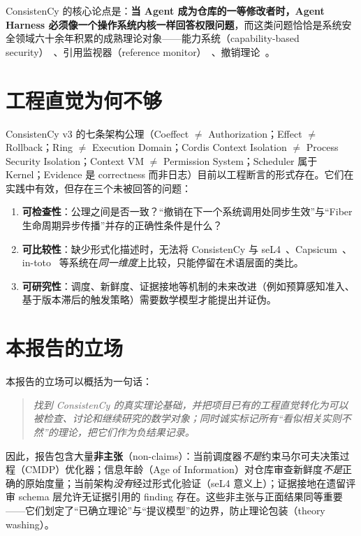 ConsistenCy 的核心论点是：\textbf{当 Agent 成为仓库的一等修改者时，Agent Harness 必须像一个操作系统内核一样回答权限问题}，而这类问题恰恰是系统安全领域六十余年积累的成熟理论对象——能力系统（capability-based security）~\cite{dennis1966,saltzer1975,miller2003,miller2006}、引用监视器（reference monitor）~\cite{anderson1972}、撤销理论~\cite{redell1974}。

\section{工程直觉为何不够}

ConsistenCy v3 的七条架构公理（Coeffect $\neq$ Authorization；Effect $\neq$ Rollback；Ring $\neq$ Execution Domain；Cordis Context Isolation $\neq$ Process Security Isolation；Context VM $\neq$ Permission System；Scheduler 属于 Kernel；Evidence 是 correctness 而非日志）目前以工程断言的形式存在。它们在实践中有效，但存在三个未被回答的问题：
\begin{enumerate}[itemsep=0.1em]
  \item \textbf{可检查性}：公理之间是否一致？“撤销在下一个系统调用处同步生效”与“Fiber 生命周期异步传播”并存的正确性条件是什么？
  \item \textbf{可比较性}：缺少形式化描述时，无法将 ConsistenCy 与 seL4~\cite{klein2009}、Capsicum~\cite{watson2010}、in-toto~\cite{torresarias2019} 等系统在\emph{同一维度}上比较，只能停留在术语层面的类比。
  \item \textbf{可研究性}：调度、新鲜度、证据接地等机制的未来改进（例如预算感知准入、基于版本滞后的触发策略）需要数学模型才能提出并证伪。
\end{enumerate}

\section{本报告的立场}

本报告的立场可以概括为一句话：
\begin{quote}
\itshape 找到 ConsistenCy 的真实理论基础，并把项目已有的工程直觉转化为可以被检查、讨论和继续研究的数学对象；同时诚实标记所有“看似相关实则不然”的理论，把它们作为负结果记录。
\end{quote}
因此，报告包含大量\textbf{非主张}（non-claims）：当前调度器\emph{不是}约束马尔可夫决策过程（CMDP）优化器；信息年龄（Age of Information）对仓库审查新鲜度\emph{不是}正确的原始度量；当前架构\emph{没有}经过形式化验证（seL4 意义上）；证据接地在遗留评审 schema 层允许无证据引用的 finding 存在。这些非主张与正面结果同等重要——它们划定了“已确立理论”与“提议模型”的边界，防止理论包装（theory washing）。
